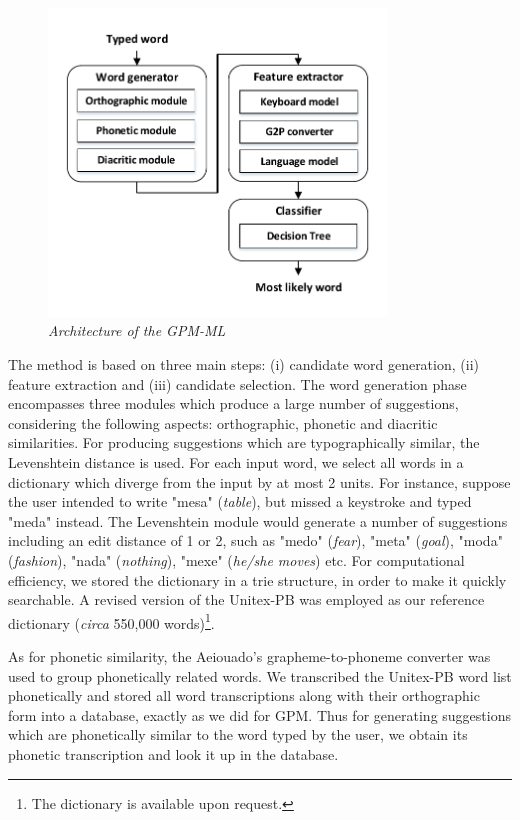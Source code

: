 \begin{figure}[h!]
  \centering
    \includegraphics[width=0.8\textwidth]{gfx/speller_architecture.pdf}
\caption{\label{fig:sys3-architecture} \it Architecture of the GPM-ML}
\end{figure}
The method is based on three main steps: (i) candidate word generation, (ii) feature extraction and (iii) candidate selection. 
The word generation phase encompasses three modules which produce a large number of suggestions, considering the following aspects: orthographic, phonetic and diacritic similarities.
For producing suggestions which are typographically similar, the Levenshtein distance is used. For each input word, we select all words in a dictionary which diverge from the input by at most 2 units. For instance, suppose the user intended to write "mesa" (\emph{table}),  
but missed a keystroke and typed "meda" instead. The Levenshtein module would generate a number of suggestions including an edit distance of 1 or 2, such as "medo" (\emph{fear}), "meta" (\emph{goal}), "moda" (\emph{fashion}), "nada" (\emph{nothing}), "mexe" (\emph{he/she moves}) etc. For computational efficiency, we stored the dictionary in a trie structure, in order to make it quickly searchable. A revised version of the Unitex-PB was employed as our reference dictionary (\emph{circa} 550,000 words)\footnote{The dictionary is available upon request.}.

As for phonetic similarity, the Aeiouado's grapheme-to-phoneme converter \cite{Mendonca2014} was used to group phonetically related words. We transcribed the Unitex-PB word list  phonetically and stored all word transcriptions along with their orthographic form into a database, exactly as we did for GPM. Thus for generating suggestions which are phonetically similar to the word typed by the user, we obtain its phonetic transcription and look it up in the database.

